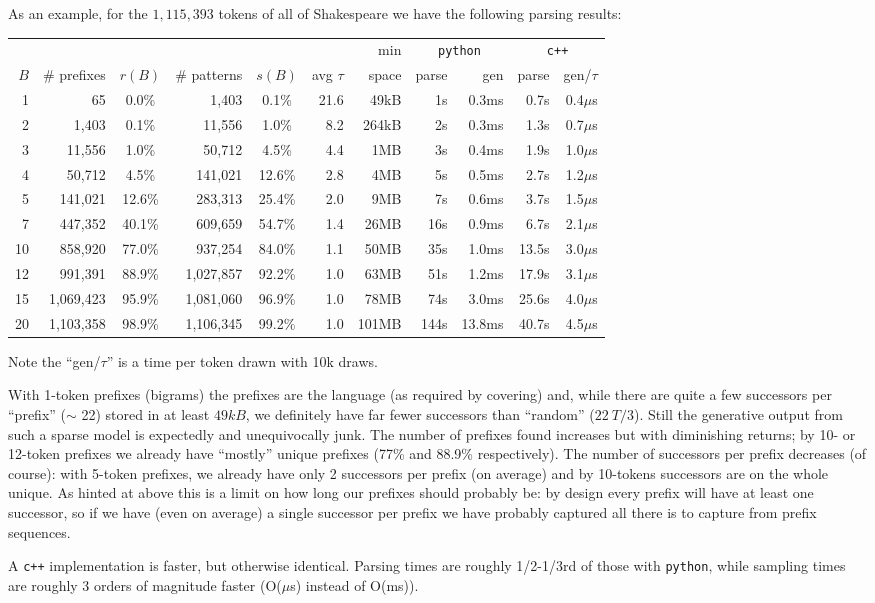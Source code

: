 \documentclass[11pt, oneside]{amsart}   	%
\begin{document}
As an example, for the $1,115,393$ tokens of all of Shakespeare we have the following parsing results:
\begin{center}
\begin{small}
\begin{tabular}{ r r c r c r r r r r r}
        &                  &             &                   &             &                   & min  & \multicolumn{2}{c}{\texttt{python}} & \multicolumn{2}{c}{\texttt{c++}} \\ \cline{8-9} \cline{10-11}
 $B$ & \# prefixes & $r(B)$ & \# patterns & $s(B)$ & avg $\tau$ & space & parse & gen & parse & gen/$\tau$ \\ \hline
 1 & 65 & 0.0\% & 1,403 & 0.1\% & 21.6 & 49kB & 1s & 0.3ms & 0.7s & 0.4$\mu$s \\  
 2 & 1,403 & 0.1\% & 11,556 & 1.0\% & 8.2 & 264kB & 2s & 0.3ms & 1.3s & 0.7$\mu$s \\  
 3 & 11,556 & 1.0\% & 50,712 & 4.5\% & 4.4 & 1MB & 3s & 0.4ms & 1.9s & 1.0$\mu$s \\
 4 & 50,712 & 4.5\% & 141,021 & 12.6\% & 2.8 & 4MB & 5s & 0.5ms & 2.7s & 1.2$\mu$s \\
 5 & 141,021 & 12.6\% & 283,313 & 25.4\% & 2.0 & 9MB & 7s & 0.6ms & 3.7s & 1.5$\mu$s \\
 7 & 447,352 & 40.1\% & 609,659 & 54.7\% & 1.4 & 26MB & 16s & 0.9ms & 6.7s & 2.1$\mu$s \\
 10 & 858,920 & 77.0\% & 937,254 & 84.0\% & 1.1 & 50MB & 35s & 1.0ms & 13.5s & 3.0$\mu$s \\  
 12 & 991,391 & 88.9\% & 1,027,857 & 92.2\% & 1.0 & 63MB & 51s & 1.2ms & 17.9s & 3.1$\mu$s \\
 15 & 1,069,423 & 95.9\% & 1,081,060 & 96.9\% & 1.0 & 78MB & 74s & 3.0ms & 25.6s & 4.0$\mu$s \\  
 20 & 1,103,358 & 98.9\% & 1,106,345 & 99.2\% & 1.0 & 101MB & 144s & 13.8ms & 40.7s & 4.5$\mu$s \\  \hline
\end{tabular}
\end{small}
\end{center}
Note the ``gen/$\tau$'' is a time per token drawn with 10k draws. 

With 1-token prefixes (bigrams) the prefixes are the language (as required by covering) and, while there are quite a few successors per ``prefix'' ($\sim$ 22) stored in at least $49kB$, we definitely have far fewer successors than ``random'' ($22 ~ T/3$). Still the generative output from such a sparse model is expectedly and unequivocally junk. The number of prefixes found increases but with diminishing returns; by 10- or 12-token prefixes we already have ``mostly'' unique prefixes (77\% and 88.9\% respectively). The number of successors per prefix decreases (of course): with 5-token prefixes, we already have only 2 successors per prefix (on average) and by 10-tokens successors are on the whole unique. As hinted at above this is a limit on how long our prefixes should probably be: by design every prefix will have at least one successor, so if we have (even on average) a single successor per prefix we have probably captured all there is to capture from prefix sequences. 

A \texttt{c++} implementation is faster, but otherwise identical. Parsing times are roughly 1/2-1/3rd of those with \texttt{python}, while sampling times are roughly 3 orders of magnitude faster (O($\mu$s) instead of O(ms)). 
\end{document}
